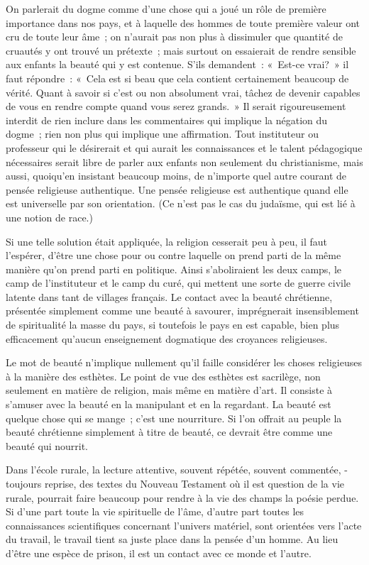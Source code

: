 \documentclass[french,twoside]{book} %
\begin{document}
On parlerait du dogme comme d'une chose qui a joué un rôle de première importance dans nos pays, et à laquelle des hommes de toute première valeur ont cru de toute leur âme ; on n'aurait pas non plus à dissimuler que quantité de cruautés y ont trouvé un prétexte ; mais surtout on essaierait de rendre sensible aux enfants la beauté qui y est contenue. S'ils demandent : « Est-ce vrai? » il faut répondre : « Cela est si beau que cela contient certainement beaucoup de vérité. Quant à savoir si c'est ou non absolument vrai, tâchez de devenir capables de vous en rendre compte quand vous serez grands. » Il serait rigoureusement interdit de rien inclure dans les commentaires qui implique la négation du dogme ; rien non plus qui implique une affirmation. Tout instituteur ou professeur qui le désirerait et qui aurait les connaissances et le talent pédagogique nécessaires serait libre de parler aux enfants non seulement du christianisme, mais aussi, quoiqu'en insistant beaucoup moins, de n'importe quel autre courant de pensée religieuse authentique. Une pensée religieuse est authentique quand elle est universelle par son orientation. (Ce n'est pas le cas du judaïsme, qui est lié à une notion de race.)\par
Si une telle solution était appliquée, la religion cesserait peu à peu, il faut l'espérer, d'être une chose pour ou contre laquelle on prend parti de la même manière qu'on prend parti en politique. Ainsi s'aboliraient les deux camps, le camp de l'instituteur et le camp du curé, qui mettent une sorte de guerre civile latente dans tant de villages français. Le contact avec la beauté chrétienne, présentée simplement comme une beauté à savourer, imprégnerait insensiblement de spiritualité la masse du pays, si toutefois le pays en est capable, bien plus efficacement qu'aucun enseignement dogmatique des croyances religieuses.\par
Le mot de beauté n'implique nullement qu'il faille considérer les choses religieuses à la manière des esthètes. Le point de vue des esthètes est sacrilège, non seulement en matière de religion, mais même en matière d'art. Il consiste à s'amuser avec la beauté en la manipulant et en la regardant. La beauté est quelque chose qui se mange ; c'est une nourriture. Si l'on offrait au peuple la beauté chrétienne simplement à titre de beauté, ce devrait être comme une beauté qui nourrit.\par
Dans l'école rurale, la lecture attentive, souvent répétée, souvent commentée, -toujours reprise, des textes du Nouveau Testament où il est question de la vie rurale, pourrait faire beaucoup pour rendre à la vie des champs la poésie perdue. Si d'une part toute la vie spirituelle de l'âme, d'autre part toutes les connaissances scientifiques concernant l'univers matériel, sont orientées vers l'acte du travail, le travail tient sa juste place dans la pensée d'un homme. Au lieu d'être une espèce de prison, il est un contact avec ce monde et l'autre.\par
\end{document}
